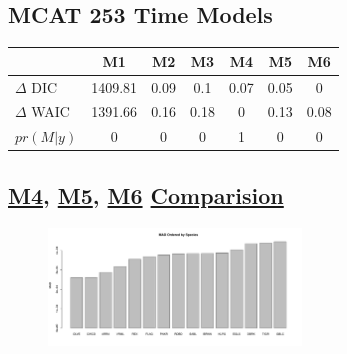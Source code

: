 \documentclass[12pt]{article}
\begin{document}
%
%
%	
%
	
\clearpage
\subsection{MCAT 253 Time Models}
	\begin{table}[h!]
	\centering
	\begin{tabular}[c]{@{}lcccccc@{}}
	\hline
	& M1 & M2 & M3 & M4 & M5 & M6 \\ \hline
	\(\Delta\) DIC & 1409.81 & 0.09 & 0.1 & 0.07 & 0.05 & 0 \\
	\(\Delta\) WAIC & 1391.66 & 0.16 & 0.18 & 0 & 0.13 & 0.08 \\
	\(pr(M|y)\) & 0 & 0 & 0 & 1 & 0 & 0	
	\end{tabular}
	\end{table}

\subsection{\href{https://github.com/gasduster99/sppComp/tree/master/sscRuns/25319781982M4}{M4}, \href{https://github.com/gasduster99/sppComp/tree/master/sscRuns/25319781982M5}{M5}, \href{https://github.com/gasduster99/sppComp/tree/master/sscRuns/25319781982M6}{M6} \href{https://github.com/gasduster99/sppComp/tree/master/try1/postSSC/25319781982M4M5M6}{Comparision}}
	\begin{figure}[ht!]
        \centering
        \includegraphics[width=0.6\textwidth]{../sscRuns/25319781982M4/sppMad68.pdf}
        \end{figure}
\end{document}
